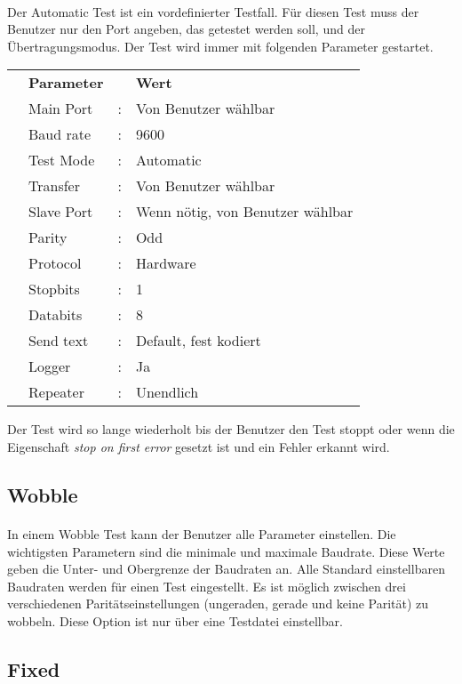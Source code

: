 \paragraph{}
Der Automatic Test ist ein vordefinierter Testfall. Für diesen Test muss der Benutzer nur den Port angeben, das getestet werden soll, und der Übertragungsmodus. Der Test wird immer mit folgenden Parameter gestartet.
\\
\begin{tabular}{llll}
\\ &\textbf{Parameter} & &\textbf{Wert}
\\ &Main Port &: &Von Benutzer wählbar
\\ &Baud rate &: &9600
\\ &Test Mode &: &Automatic
\\ &Transfer &: &Von Benutzer wählbar
\\ &Slave Port &: &Wenn nötig, von Benutzer wählbar
\\ &Parity &: &Odd
\\ &Protocol &: &Hardware
\\ &Stopbits &: &1
\\ &Databits &: &8
\\ &Send text &: &Default, fest kodiert
\\ &Logger &: &Ja
\\ &Repeater &: &Unendlich
\end{tabular}

Der Test wird so lange wiederholt bis der Benutzer den Test stoppt oder wenn die Eigenschaft \textit{stop on first error} gesetzt ist und ein Fehler erkannt wird.



\subsection{Wobble}
\paragraph{}
In einem Wobble Test kann der Benutzer alle Parameter einstellen. Die wichtigsten Parametern sind die minimale und maximale Baudrate. Diese Werte geben die Unter- und Obergrenze der Baudraten an. Alle Standard einstellbaren Baudraten werden für einen Test eingestellt. Es ist möglich zwischen drei verschiedenen Paritätseinstellungen (ungeraden, gerade und keine Parität) zu wobbeln. Diese Option ist nur über eine Testdatei einstellbar.


\subsection{Fixed}
